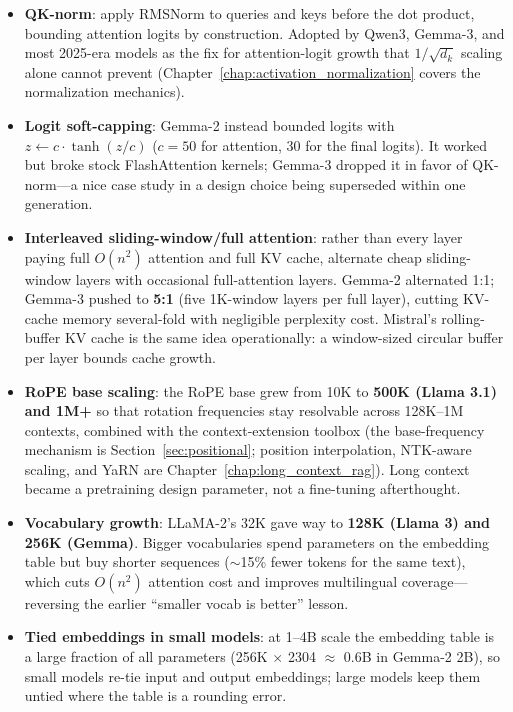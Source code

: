 \begin{itemize}
    \item \textbf{QK-norm}: apply RMSNorm to queries and keys before the dot product, bounding attention logits by construction. Adopted by Qwen3, Gemma-3, and most 2025-era models as the fix for attention-logit growth that $1/\sqrt{d_k}$ scaling alone cannot prevent (Chapter~\ref{chap:activation_normalization} covers the normalization mechanics).
    \item \textbf{Logit soft-capping}: Gemma-2 instead bounded logits with $z \leftarrow c \cdot \tanh(z/c)$ ($c{=}50$ for attention, $30$ for the final logits). It worked but broke stock FlashAttention kernels; Gemma-3 dropped it in favor of QK-norm---a nice case study in a design choice being superseded within one generation.
    \item \textbf{Interleaved sliding-window/full attention}: rather than every layer paying full $O(n^2)$ attention and full KV cache, alternate cheap sliding-window layers with occasional full-attention layers. Gemma-2 alternated 1:1; Gemma-3 pushed to \textbf{5:1} (five 1K-window layers per full layer), cutting KV-cache memory several-fold with negligible perplexity cost. Mistral's rolling-buffer KV cache is the same idea operationally: a window-sized circular buffer per layer bounds cache growth.
    \item \textbf{RoPE base scaling}: the RoPE base grew from 10K to \textbf{500K (Llama 3.1) and 1M+} so that rotation frequencies stay resolvable across 128K--1M contexts, combined with the context-extension toolbox (the base-frequency mechanism is Section~\ref{sec:positional}; position interpolation, NTK-aware scaling, and YaRN are Chapter~\ref{chap:long_context_rag}). Long context became a pretraining design parameter, not a fine-tuning afterthought.
    \item \textbf{Vocabulary growth}: LLaMA-2's 32K gave way to \textbf{128K (Llama 3) and 256K (Gemma)}. Bigger vocabularies spend parameters on the embedding table but buy shorter sequences ($\sim$15\% fewer tokens for the same text), which cuts $O(n^2)$ attention cost and improves multilingual coverage---reversing the earlier ``smaller vocab is better'' lesson.
    \item \textbf{Tied embeddings in small models}: at 1--4B scale the embedding table is a large fraction of all parameters (256K $\times$ 2304 $\approx$ 0.6B in Gemma-2 2B), so small models re-tie input and output embeddings; large models keep them untied where the table is a rounding error.
\end{itemize}

